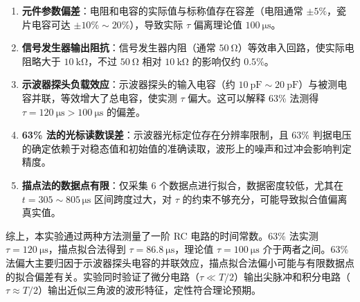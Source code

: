 \begin{enumerate}[label=\arabic*.]
    \item \textbf{元件参数偏差}：电阻和电容的实际值与标称值存在容差（电阻通常 \(\pm5\%\)，瓷片电容可达 \(\pm10\%\sim20\%\)），导致实际 \(\tau\) 偏离理论值 \(\SI{100}{\micro\second}\)。

    \item \textbf{信号发生器输出阻抗}：信号发生器内阻（通常 \(\SI{50}{\ohm}\)）等效串入回路，使实际电阻略大于 \(\SI{10}{\kilo\ohm}\)，不过 \(\SI{50}{\ohm}\) 相对 \(\SI{10}{\kilo\ohm}\) 的影响仅约 \(0.5\%\)。

    \item \textbf{示波器探头负载效应}：示波器探头的输入电容（约 \(\SI{10}{\pico\farad}\sim\SI{20}{\pico\farad}\)）与被测电容并联，等效增大了总电容，使实测 \(\tau\) 偏大。这可以解释 63\% 法测得 \(\tau = \SI{120}{\micro\second} > \SI{100}{\micro\second}\) 的偏差。

    \item \textbf{63\% 法的光标读数误差}：示波器光标定位存在分辨率限制，且 63\% 判据电压的确定依赖于对稳态值和初始值的准确读取，波形上的噪声和过冲会影响判定精度。

    \item \textbf{描点法的数据点有限}：仅采集 6 个数据点进行拟合，数据密度较低，尤其在 \(t=305\sim805\,\si{\micro\second}\) 区间跨度过大，对 \(\tau\) 的约束不够充分，可能导致拟合值偏离真实值。

\end{enumerate}

综上，本实验通过两种方法测量了一阶 RC 电路的时间常数。63\% 法实测 \(\tau = \SI{120}{\micro\second}\)，描点拟合法得到 \(\tau = \SI{86.8}{\micro\second}\)，理论值 \(\tau = \SI{100}{\micro\second}\) 介于两者之间。63\% 法偏大主要归因于示波器探头电容的并联效应，描点拟合法偏小可能与有限数据点的拟合偏差有关。实验同时验证了微分电路（\(\tau \ll T/2\)）输出尖脉冲和积分电路（\(\tau \approx T/2\)）输出近似三角波的波形特征，定性符合理论预期。

